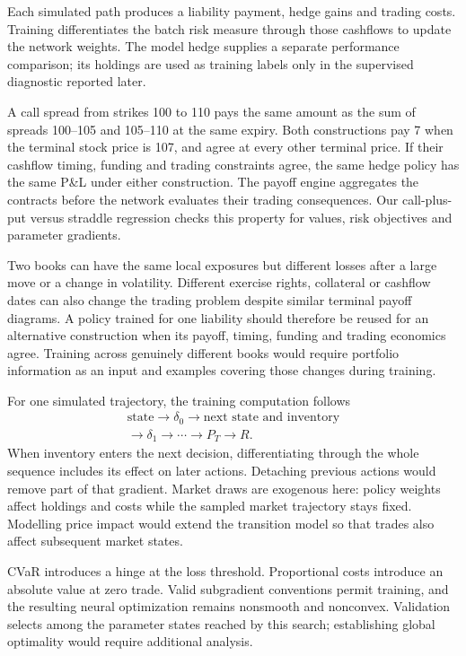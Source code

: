 \documentclass[8pt]{strategynet-journal}
\begin{document}
\begin{SNcolumns}
Each simulated path produces a liability payment, hedge gains and trading
costs. Training differentiates the batch risk measure through those cashflows
to update the network weights. The model hedge supplies a separate performance
comparison; its holdings are used as training labels only in the supervised
diagnostic reported later.

A call spread from strikes 100 to 110 pays the same amount as the sum of
spreads 100--105 and 105--110 at the same expiry. Both constructions pay 7 when the
terminal stock price is 107, and agree at every other terminal price. If their
cashflow timing, funding and trading constraints agree, the same hedge policy
has the same P\&L under either construction. The payoff engine aggregates the
contracts before the network evaluates their trading consequences. Our
call-plus-put versus straddle regression checks this property for values, risk
objectives and parameter gradients.

Two books can have the same
local exposures but different losses after a large move or a change in
volatility. Different exercise rights, collateral or cashflow dates can also
change the trading problem despite similar terminal payoff diagrams. A policy
trained for one liability should therefore be reused for an alternative
construction when its payoff, timing, funding and trading economics agree. Training across genuinely
different books would require portfolio information as an input and examples
covering those changes during training.

For one simulated trajectory, the training computation follows
\[
 \begin{gathered}
 \text{state}\longrightarrow\delta_0\longrightarrow
 \text{next state and inventory}\\
 \longrightarrow\delta_1\longrightarrow\cdots
 \longrightarrow P_T\longrightarrow R.
 \end{gathered}
\]
When inventory enters the next decision, differentiating through the whole
sequence includes its effect on later actions. Detaching previous actions
would remove part of that gradient. Market draws are exogenous here: policy
weights affect holdings and costs while the sampled market trajectory stays
fixed. Modelling price impact would extend the transition model so that trades
also affect subsequent market states.

CVaR introduces a hinge at the loss threshold. Proportional costs introduce an
absolute value at zero trade. Valid subgradient conventions permit training,
and the resulting neural optimization remains nonsmooth and nonconvex.
Validation selects among the parameter states reached by this search;
establishing global optimality would require additional analysis.


\end{SNcolumns}
\end{document}
